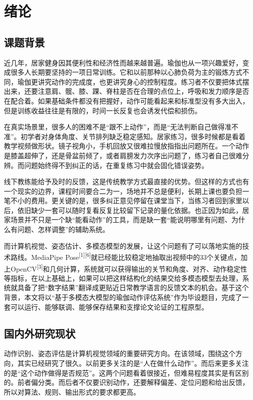 \chapter{绪论}

\section{课题背景}
近几年，居家健身因其便利性和经济性而越来越普遍。瑜伽也从一项兴趣爱好，变成很多人长期要坚持的一项日常训练。它和以前那种以心肺负荷为主的锻炼方式不同，瑜伽更讲究动作的完成度，也更讲究身心的控制程度。练习者不仅要把体式摆出来，还要注意肩、髋、膝、踝、脊柱是否在合理的点位上，呼吸和发力顺序是否在配合着。如果基础条件都没有把握好，动作可能看起来和标准型没有多大出入，但是训练收益往往是有限的，时间一长反复也会诱发代偿和损伤。

在真实场景里，很多人的困难不是“跟不上动作”，而是“无法判断自己做得准不准”。初学者对身体角度、关节排列缺乏稳定感知。居家练习，很多时候都是看着教学视频做形状。镜子视角小，手机回放又很难拉慢放指指出问题所在。一个动作是膝盖超伸了，还是骨盆前倾了，或者肩膀发力次序出问题了，练习者自己很难分辨。而问题始终得不到纠正的话，在重复练习中就会固化错误姿势。

线下教练能给予及时的反馈，这是传统教学方式最直接的优势。但这样的方式也有一个现实的边界，课程时间要合二为一，场地并不总是便利，长期上课也要负担一笔不小的费用。更关键的是，很多纠正意见停留在课堂当下，当练习者回到家里以后，依旧缺少一套可以随时复看反复比较留下记录的量化依据。也正因为如此，居家场景并不只是一个缺“能看动作”的工具，而是缺一套“能说明哪里有问题、为什么有问题、怎样调整”的辅助系统。

而计算机视觉、姿态估计、多模态模型的发展，让这个问题有了可以落地实施的技术路线。MediaPipe Pose\textsuperscript{[1][6]}就已经能比较稳定地抽取出视频中的33个关键点，加上OpenCV\textsuperscript{[3]}和几何计算，系统就可以获得输出的关节和角度、对齐、动作稳定性等指标，在以上基础上，如果可以把这样结构化的结果交给多模态模型去处理，系统就具备了把“数字结果”翻译成更贴近日常教学语言的反馈文本的机会。基于这个背景，本文将以“基于多模态大模型的瑜伽动作评估系统”作为毕设题目，完成了一套可以运行、能够联调、能够保存结果和支撑论文论证的工程原型。

\section{国内外研究现状}
动作识别、姿态评估是计算机视觉领域的重要研究方向。在该领域，围绕这个方向，其实已经研究了很久。以前更多关注的是“人在做什么动作”。而后来更多关注的是“这个动作做得是否规范”。这两个问题看着很接近，但难易程度其实是有区别的。前者偏分类。而后者不仅要识别动作，还要解释偏差、定位问题和给出反馈，所以对算法、规则、输出形式的要求都更高。

